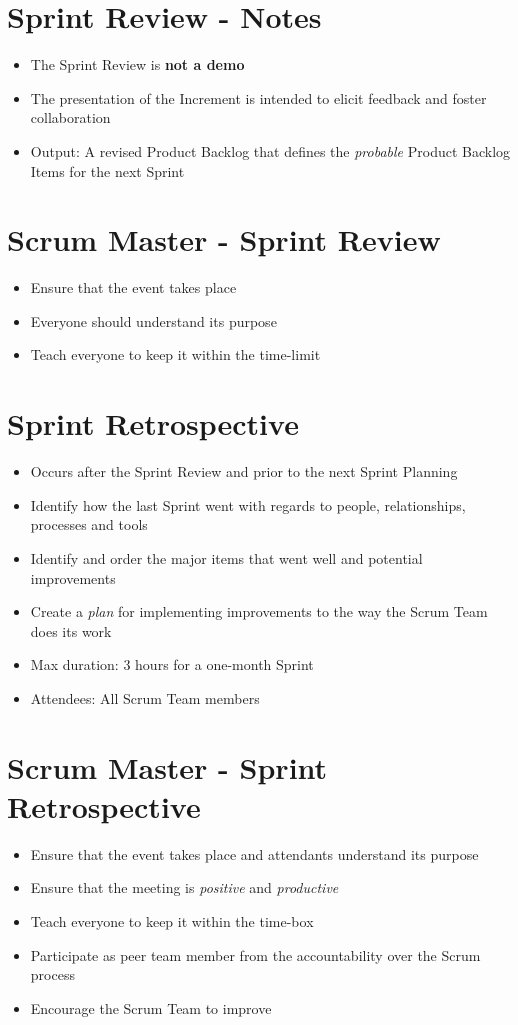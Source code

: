 \documentclass[a4paper,11pt,twocolumn]{article}
\begin{document}
\section*{Sprint Review - Notes}
\begin{itemize}
	\item The Sprint Review is \textbf{not a demo}
	\item The presentation of the Increment is intended to elicit feedback and foster collaboration
	\item Output: A revised Product Backlog that defines the \textit{probable} Product Backlog Items for the next Sprint
\end{itemize}

\section*{Scrum Master - Sprint Review}
\begin{itemize}
	\item Ensure that the event takes place
	\item Everyone should understand its purpose
	\item Teach everyone to keep it within the time-limit
\end{itemize}

\section*{Sprint Retrospective}
\begin{itemize}
	\item Occurs after the Sprint Review and prior to the next Sprint Planning
	\item Identify how the last Sprint went with regards to people, relationships, processes and tools
	\item Identify and order the major items that went well and potential improvements
	\item Create a \textit{plan} for implementing improvements to the way the Scrum Team does its work
	\item Max duration: 3 hours for a one-month Sprint
	\item Attendees: All Scrum Team members
\end{itemize}

\section*{Scrum Master - Sprint Retrospective}
\begin{itemize}
	\item Ensure that the event takes place and attendants understand its purpose
	\item Ensure that the meeting is \textit{positive} and \textit{productive}
	\item Teach everyone to keep it within the time-box
	\item Participate as peer team member from the accountability over the Scrum process
	\item Encourage the Scrum Team to improve
\end{itemize}
\end{document}
